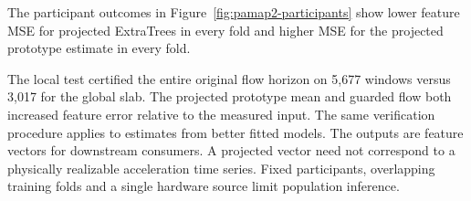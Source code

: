 The participant outcomes in Figure~\ref{fig:pamap2-participants} show
lower feature MSE for projected ExtraTrees in every fold and higher
MSE for the projected prototype estimate in every fold.

The local test certified the entire original flow horizon on 5,677
windows versus 3,017 for the global slab. The projected prototype mean
and guarded flow both increased feature error relative to the measured
input. The same verification procedure applies to estimates from better
fitted models. The outputs are feature vectors for downstream consumers.
A projected vector need not correspond to a physically realizable
acceleration time series. Fixed participants, overlapping training
folds and a single hardware source limit population inference.
